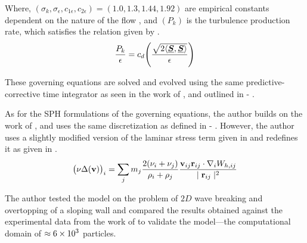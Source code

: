 Where, $(\sigma_k, \sigma_{\epsilon}, c_{1\epsilon}, c_{2\epsilon}) = (1.0, 1.3, 1.44, 1.92)$ are empirical constants dependent on the nature of the flow , and $(P_k)$ is the turbulence production rate, which satisfies the relation given by  \parencite{pope2000turbulent}.
\begin{equation}
    \frac{P_k}{\epsilon} = c_d \Bigg( \frac{\sqrt{2 \langle \underline{\bm{S}}, \underline{\bm{S}} \rangle}}{\epsilon} \Bigg)
    \label{eq:pope2000turbulent-k-production-relation}
\end{equation}

These governing equations are solved and evolved using the same predictive-corrective time integrator as seen in the work of \cite{Gotoh2004}, and outlined in  - .

As for the SPH formulations of the governing equations, the author builds on the work of \cite{Gotoh2004}, and uses the same discretization as defined in  - . However, the author uses a slightly modified version of the laminar stress term given in  and redefines it as given in .
\begin{equation}
    \big(\nu \Delta(\mathbf{v}) \big)_i = \sum_j m_j \frac{2 ( \nu_i + \nu_j ) }{ \rho_i + \rho_j }\frac{\mathbf{v}_{ij} \mathbf{r}_{ij} \cdot \nabla_{i} W_{h, ij}}{\mid \mathbf{r}_{ij} \mid^{2}}
    \label{eq:Shao2006-vel-laplacian-sph}
\end{equation}

The author tested the model on the problem of $2D$ wave breaking and overtopping of a sloping wall and compared the results obtained against the experimental data from the work of \cite{li2004wave} to validate the model—the computational domain of $\approx 6 \times {10}^{3}$ particles.

